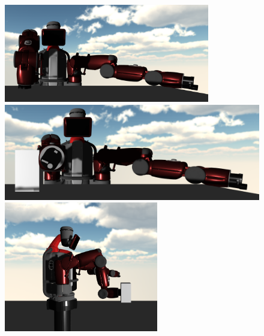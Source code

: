 \begin{figure}[htb]
	\hfill
	\centering
	\begin{minipage}{0.33\textwidth}
		\centering
		\includegraphics[width=0.8\textwidth]{imagenes/Baxter_Colliding/FrontViewCollidingX.png}     
		\caption{}\label{Fig:FrontViewCollidingX}
	\end{minipage}\hfill
	\begin{minipage}{0.33\textwidth}
		\centering
		\includegraphics[width=1\textwidth]{imagenes/Baxter_Colliding/FrontViewCollidingY.png}     
		\caption{}\label{Fig:FrontViewCollidingY}
	\end{minipage}\hfill
	\begin{minipage}{0.34\textwidth}
		\centering
		\includegraphics[width=0.6\textwidth]{imagenes/Baxter_Colliding/LateralViewCollidingZ.png}     
		\caption{}\label{Fig:LateralViewCollidingZ}
	\end{minipage}
\end{figure}

